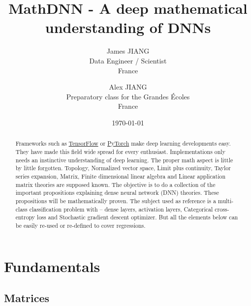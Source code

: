 \documentclass[11pt,en]{elegantpaper}
\title{MathDNN - A deep mathematical understanding of DNNs}
\author{James JIANG \\ Data Engineer / Scientist \\ France \and Alex JIANG \\ Preparatory class for the Grandes Écoles \\ France}
\institute{\href{https://github.com/iLoveDataJjia}{iLoveDataJjia Github}}
\date{\today}
\begin{document}
\maketitle

\begin{abstract}
  Frameworks such as \href{https://www.tensorflow.org/?hl=en}{TensorFlow} or \href{https://pytorch.org/}{PyTorch} make deep learning developments
  easy. They have made this field wide spread for every enthusiast. Implementations only needs an instinctive understanding of deep learning.
  The proper math aspect is little by little forgotten. Topology, Normalized vector space, Limit plus continuity, Taylor series expansion, Matrix,
  Finite dimensional linear algebra and Linear application matrix theories are supposed known. The objective is to do a collection of the
  important propositions explaining dense neural network (DNN) theories. These propositions will be mathematically proven. The subject used
  as reference is a multi-class classification problem with – dense layers, activation layers, Categorical cross-entropy loss and Stochastic
  gradient descent optimizer. But all the elements below can be easily re-used or re-defined to cover regressions.
\end{abstract}

\section{Fundamentals}

\subsection{Matrices}
\end{document}
